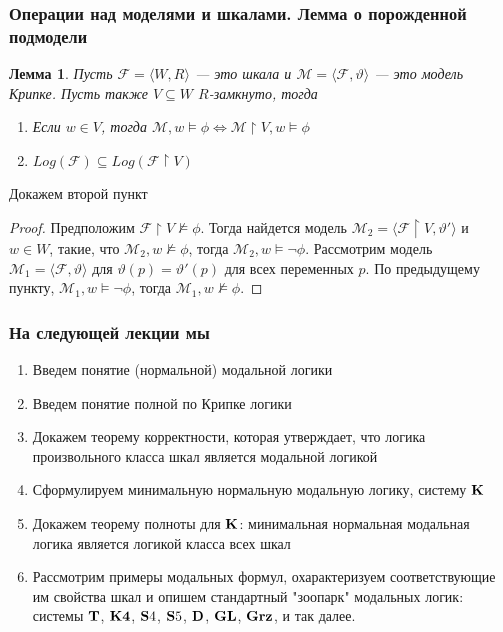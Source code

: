\documentclass[pdf,utf8,russian,aspectratio=169]{beamer}
\newtheorem{lem}{Лемма}
\begin{document}
\begin{frame}
  \frametitle{Операции над моделями и шкалами. Лемма о порожденной подмодели}

\begin{lem} Пусть $\mathcal{F} = \langle W, R \rangle$ --- это шкала и $\mathcal{M} = \langle \mathcal{F}, \vartheta \rangle$
  --- это модель Крипке. Пусть также $V \subseteq W$ $R$-замкнуто, тогда
  \begin{enumerate}
    \item Если $w \in V$, тогда $\mathcal{M}, w \models \phi \Leftrightarrow \mathcal{M} \upharpoonright V, w \models \phi $
    \item $Log(\mathcal{F}) \subseteq Log(\mathcal{F} \upharpoonright V)$
  \end{enumerate}
\end{lem}

Докажем второй пункт
\begin{proof} Предположим $\mathcal{F} \upharpoonright V\not\models \phi$. Тогда найдется модель $\mathcal{M}_2 = \langle
\mathcal{F} \upharpoonright V, \vartheta' \rangle$ и $w \in W$, такие, что $\mathcal{M}_2, w\not\models \phi$, тогда
$\mathcal{M}_2, w \models \neg\phi$. Рассмотрим модель $\mathcal{M}_1 = \langle \mathcal{F}, \vartheta \rangle$ для $\vartheta(p) = \vartheta'(p)$ для всех переменных $p$. По предыдущему пункту, $\mathcal{M}_1, w \models \neg\phi$, тогда
$\mathcal{M}_1, w\not\models \phi$.
\end{proof}

\end{frame}

\begin{frame}
  \frametitle{На следующей лекции мы}

  \begin{enumerate}
    \item Введем понятие (нормальной) модальной логики
    \item Введем понятие полной по Крипке логики
    \item Докажем теорему корректности, которая утверждает, что логика произвольного класса шкал является модальной логикой
    \item Сформулируем минимальную нормальную модальную логику, систему ${\bf K}$
    \item Докажем теорему полноты для ${\bf K}$: минимальная нормальная модальная логика является логикой класса всех шкал
    \item Рассмотрим примеры модальных формул, охарактеризуем соответствующие им свойства шкал и опишем стандартный "зоопарк"
    модальных логик: системы ${\bf T}$, ${\bf K4}$, ${\bf S}4$, ${\bf S}5$, ${\bf D}$, ${\bf GL}$, ${\bf Grz}$, и так далее.
  \end{enumerate}
\end{frame}
\end{document}
